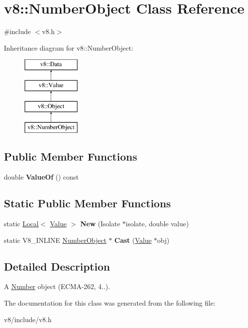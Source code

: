 \hypertarget{classv8_1_1NumberObject}{}\section{v8\+:\+:Number\+Object Class Reference}
\label{classv8_1_1NumberObject}


{\ttfamily \#include $<$v8.\+h$>$}

Inheritance diagram for v8\+:\+:Number\+Object\+:\begin{figure}[H]
\begin{center}
\leavevmode
\includegraphics[height=4.000000cm]{classv8_1_1NumberObject}
\end{center}
\end{figure}
\subsection*{Public Member Functions}
\begin{DoxyCompactItemize}
\item 
\mbox{\label{classv8_1_1NumberObject_abe15c092159cea5dc15908cce77b8a40}} 
double {\bfseries Value\+Of} () const
\end{DoxyCompactItemize}
\subsection*{Static Public Member Functions}
\begin{DoxyCompactItemize}
\item 
\mbox{\label{classv8_1_1NumberObject_ad6e3d9fe36d6389fe90f2645cab8a2d7}} 
static \mbox{\hyperlink{classv8_1_1Local}{Local}}$<$ \mbox{\hyperlink{classv8_1_1Value}{Value}} $>$ {\bfseries New} (Isolate $\ast$isolate, double value)
\item 
\mbox{\label{classv8_1_1NumberObject_a77500b6fed40f36fed616e865fd1ed07}} 
static V8\+\_\+\+I\+N\+L\+I\+NE \mbox{\hyperlink{classv8_1_1NumberObject}{Number\+Object}} $\ast$ {\bfseries Cast} (\mbox{\hyperlink{classv8_1_1Value}{Value}} $\ast$obj)
\end{DoxyCompactItemize}


\subsection{Detailed Description}
A \mbox{\hyperlink{classv8_1_1Number}{Number}} object (E\+C\+M\+A-\/262, 4..). 

The documentation for this class was generated from the following file\+:\begin{DoxyCompactItemize}
\item 
v8/include/v8.\+h\end{DoxyCompactItemize}
